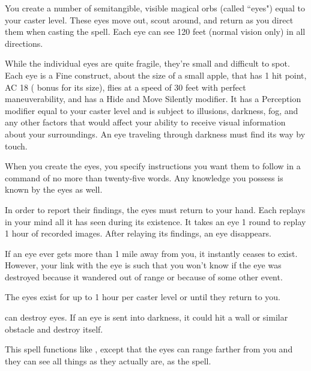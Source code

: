\begin{spelleffect}
You create a number of semitangible, visible magical orbs (called ``eyes") equal to your caster level. These eyes move out, scout around, and return as you direct them when casting the spell. Each eye can see 120 feet (normal vision only) in all directions.
\par While the individual eyes are quite fragile, they're small and difficult to spot. Each eye is a Fine construct, about the size of a small apple, that has 1 hit point, AC 18 ( bonus for its size), flies at a speed of 30 feet with perfect maneuverability, and has a  Hide and Move Silently modifier. It has a Perception modifier equal to your caster level and is subject to illusions, darkness, fog, and any other factors that would affect your ability to receive visual information about your surroundings. An eye traveling through darkness must find its way by touch.
\par When you create the eyes, you specify instructions you want them to follow in a command of no more than twenty-five words. Any knowledge you possess is known by the eyes as well.
\par In order to report their findings, the eyes must return to your hand. Each replays in your mind all it has seen during its existence. It takes an eye 1 round to replay 1 hour of recorded images. After relaying its findings, an eye disappears.
\par If an eye ever gets more than 1 mile away from you, it instantly ceases to exist. However, your link with the eye is such that you won't know if the eye was destroyed because it wandered out of range or because of some other event.
\par The eyes exist for up to 1 hour per caster level or until they return to you.
\end{spelleffect}
\begin{spellnotes}
 can destroy eyes. If an eye is sent into darkness, it could hit a wall or similar obstacle and destroy itself.
\end{spellnotes}

\begin{spelleffect}
This spell functions like , except that the eyes can range farther from you and they can see all things as they actually are, as the  spell.
\end{spelleffect}

